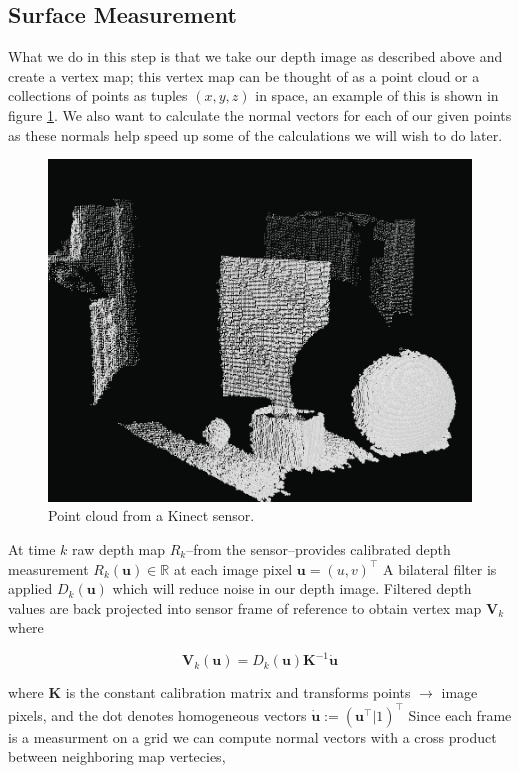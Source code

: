 \documentclass[10pt, twocolumn]{article}
\begin{document}
\subsection{Surface Measurement}
What we do in this step is that we take our depth image as described above and create a vertex map; this vertex map can be thought of as a point cloud or a collections of points as tuples $(x, y, z)$ in space, an example of this is shown in figure \ref{fig:pointcloud}. We also want to calculate the normal vectors for each of our given points as these normals help speed up some of the calculations we will wish to do later.

\begin{figure}
  \centering
  \includegraphics[width=0.8\linewidth]{pointcloud}
  \caption{Point cloud from a Kinect sensor.}
  \label{fig:pointcloud}
\end{figure}



At time $k$ raw depth map $R_k$--from the sensor--provides calibrated depth measurement $R_k(\mathbf{u}) \in \mathbb{R}$ at each image pixel $\mathbf{u} = (u,v)^{\top}$
A bilateral filter is applied $D_k(\mathbf{u})$ which will reduce noise in our depth image.
Filtered depth values are back projected into sensor frame of reference to obtain vertex map $\mathbf{V}_k$ where 

\begin{equation}
\mathbf{V}_k(\mathbf{u}) = D_k(\mathbf{u})\mathbf{K}^{-1}\dot{\mathbf{u}}
\end{equation}

where $\mathbf{K}$ is the constant calibration matrix and transforms points $\rightarrow$ image pixels, and the dot denotes homogeneous vectors $\mathbf{\dot{u}} := (\mathbf{u}^{\top}|1)^{\top}$
Since each frame is a measurment on a grid we can compute normal vectors with a cross product between neighboring map vertecies,
\end{document}
